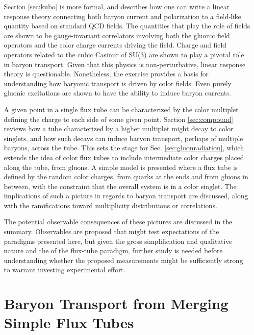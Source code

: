 \documentclass[aps, prc, 12pt, nofootinbib, showpacs, superscriptaddress, tightenlines, groupedaddress]{revtex4-2}
\begin{document}
Section \ref{sec:kubo} is more formal, and describes how one can write a linear response theory connecting both baryon current and polarization to a field-like quantity based on standard QCD fields. The quantities that play the role of fields are shown to be gauge-invariant correlators involving both the gluonic field operators and the color charge currents driving the field. Charge and field operators related to the cubic Casimir of SU(3) are shown to play a pivotal role in baryon transport. Given that this physics is non-perturbative, linear response theory is questionable. Nonetheless, the exercise provides a basis for understanding how baryonic transport is driven by color fields. Even purely gluonic excitations are shown to have the ability to induce baryon currents.

A given point in a single flux tube can be characterized by the color multiplet defining the charge to each side of some given point. Section \ref{sec:compound} reviews how a tube characterized by a higher multiplet might decay to color singlets, and how such decays can induce baryon transport, perhaps of multiple baryons, across the tube. This sets the stage for Sec. \ref{sec:gluonradiation}, which extends the idea of color flux tubes to include intermediate color charges placed along the tube, from gluons. A simple model is presented where a flux tube is defined by the random color charges, from quarks at the ends and from gluons in between, with the constraint that the overall system is in a color singlet. The implications of such a picture in regards to baryon transport are discussed, along with the ramifications toward multiplicity distributions or correlations.

The potential observable consequences of these pictures are discussed in the summary. Observables are proposed that might test expectations of the paradigms presented here, but given the gross simplification and qualitative nature and the of the flux-tube paradigm, further study is needed before understanding whether the proposed measurements  might be sufficiently strong to warrant investing experimental effort. 

\section{Baryon Transport from Merging Simple Flux Tubes}\label{sec:simple}
\end{document}
